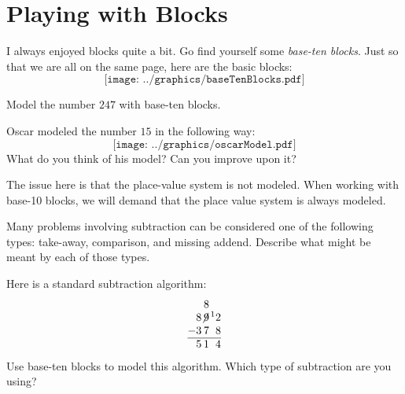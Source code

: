 \newpage
\section{Playing with Blocks}\label{A:B1}

I always enjoyed blocks quite a bit. Go find yourself
some \textit{base-ten blocks}. Just so that we are all on the same
page, here are the basic blocks:
\[
\texttt{[image: ../graphics/baseTenBlocks.pdf]}
\]

\begin{prob} 
Model the number $247$ with base-ten blocks.
\vspace{0.8in}
\end{prob}

\begin{prob}
Oscar modeled the number $15$ in the following way:
\[
\texttt{[image: ../graphics/oscarModel.pdf]}
\]
What do you think of his model?  Can you improve upon it?  
\vspace{0.5in}
\end{prob}

\begin{teachingnote}
The issue here is that the place-value system is not modeled. When
working with base-10 blocks, we will demand that the place value
system is always modeled.
\end{teachingnote}

\begin{prob}
Many problems involving subtraction can be considered one of the following types:  take-away, comparison, and missing addend.  Describe what might be meant by each of those types.  
\end{prob}

\newpage

\begin{prob} 
Here is a standard subtraction algorithm:
\[
\begin{tabular}{@{}r@{}r@{}r@{}r@{}}
&   & 8 &  \\
& 8 & $\not{\hspace{-.2ex}9}$ & $\hspace{.3ex}\leftexp{1}2$\\
$-$ & 3 & 7 & 8\\ \hline
& 5 & 1 & 4
\end{tabular}
\]
Use base-ten blocks to model this algorithm.  Which type of subtraction are you using?  
\end{prob}

\newpage

